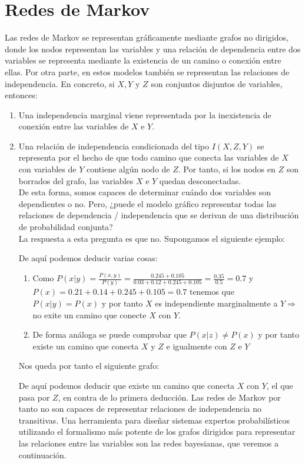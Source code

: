 \documentclass{article}
\begin{document}
\section{Redes de Markov}
Las redes de Markov se representan gráficamente mediante grafos no dirigidos, donde los nodos representan las variables y una relación de dependencia entre dos variables se representa mediante la existencia de un camino o conexión entre ellas. Por otra parte, en estos modelos también se representan las relaciones de independencia. En concreto, si $X,Y$ y $Z$ son conjuntos disjuntos de variables, entonces:
\begin{enumerate}
\item Una independencia marginal viene representada por la inexistencia de conexión entre las variables de $X$ e $Y$.
\item Una relación de independencia condicionada del tipo $I(X,Z,Y)$ se representa por el hecho de que todo camino que conecta las variables de $X$ con variables de $Y$ contiene algún nodo de $Z$. Por tanto, si los nodos en $Z$ son borrados del grafo, las variables $X$ e $Y$ quedan desconectadas.\\
De esta forma, somos capaces de determinar cuándo dos variables son dependientes o no. Pero, ¿puede el modelo gráfico representar todas las relaciones de dependencia / independencia que se derivan de una distribución de probabilidad conjunta?\\
La respuesta a esta pregunta es que no. Supongamos el siguiente ejemplo:

De aquí podemos deducir varias cosas:
\begin{enumerate}
\item Como $P(x|y)=\frac{P(x,y)}{P(y)} = \frac{0.245+0.105}{0.03+0.12+0.245+0.105} = \frac{0.35}{0.5} = 0.7$ y $P(x)=0.21+0.14+0.245+0.105 = 0.7$ tenemos que $P(x|y)=P(x)$ y por tanto $X$ es independiente marginalmente a $Y \Rightarrow$ no exite un camino que conecte $X$ con $Y$.
\item De forma análoga se puede comprobar que $P(x|z)\neq P(x)$ y por tanto existe un camino que conecta $X$ y $Z$ e igualmente con $Z$ e $Y$
\end{enumerate}

Nos queda por tanto el siguiente grafo:

De aquí podemos deducir que existe un camino que conecta $X$ con $Y$, el que pasa por $Z$, en contra de lo primera deducción. Las redes de Markov por tanto no son capaces de representar relaciones de independencia no transitivas. Una herramienta para diseñar sistemas expertos probabilísticos utilizando el formalismo más potente de los grafos dirigidos para representar las relaciones entre las variables son las redes bayesianas, que veremos a continuación.
\end{enumerate}
\end{document}

